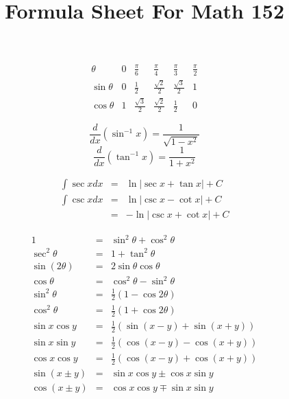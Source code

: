 \documentclass[10pt]{article}
\title{Formula Sheet For Math 152}
\author{}
\date{}
\begin{document}
\twocolumn




$$\begin{array}{cccccc}
\theta&0&\frac{\pi}{6}&\frac{\pi}{4}&\frac{\pi}{3}&\frac{\pi}{2}\\
\sin \theta&0&\frac{1}{2}&\frac{\sqrt{2}}{2}&\frac{\sqrt{3}}{2}&1\\
\cos \theta&1&\frac{\sqrt{3}}{2}&\frac{\sqrt{2}}{2}&\frac{1}{2}&0
\end{array}$$


$$\frac{d}{dx}(\sin^{-1} x)=\frac{1}{\sqrt{1-x^{2}}}$$
$$\frac{d}{dx}(\tan^{-1} x)=\frac{1}{1+x^{2}}$$


\begin{eqnarray*}
\int\sec xdx&=&\ln |\sec x+\tan x|+C\\
\int\csc x dx&=&\ln |\csc x-\cot x|+C\\
&=&-\ln |\csc x+\cot x|+C
\end{eqnarray*}


\begin{eqnarray*}
1&=&\sin^{2}\theta+\cos^{2}\theta\\
\sec^{2}\theta&=&1+\tan^{2}\theta\\
\sin (2\theta)&=&2\sin\theta\cos\theta\\
\cos\theta&=&\cos^{2}\theta-\sin^{2}\theta\\
\sin^{2}\theta&=&\frac{1}{2}(1-\cos 2\theta)\\
\cos^{2}\theta&=&\frac{1}{2}(1+\cos 2\theta)\\
\sin x\cos y&=&\frac{1}{2}(\sin (x-y)+\sin(x+y))\\
\sin x\sin y&=&\frac{1}{2}(\cos (x-y)-\cos(x+y))\\
\cos x\cos y&=&\frac{1}{2}(\cos (x-y)+\cos(x+y))\\
\sin(x\pm y)&=&\sin x\cos y\pm \cos x\sin y\\
\cos(x\pm y)&=&\cos x\cos y\mp \sin x\sin y\\
\end{eqnarray*}
 
\end{document}
